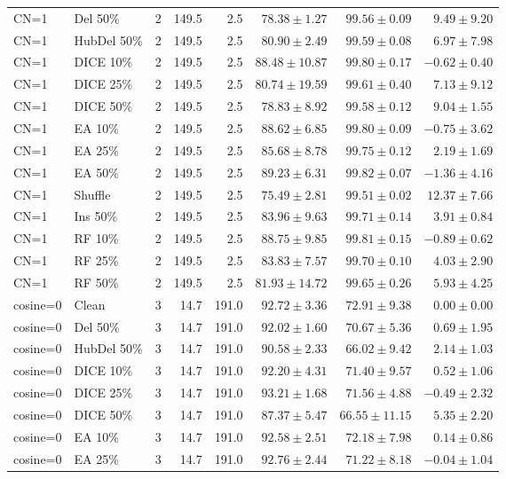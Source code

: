 {\begin{longtable}{llrrrrrr}
CN=1 & Del 50\% & 2 & 149.5 & 2.5 & $78.38\pm1.27$ & $99.56\pm0.09$ & $9.49\pm9.20$ \\
CN=1 & HubDel 50\% & 2 & 149.5 & 2.5 & $80.90\pm2.49$ & $99.59\pm0.08$ & $6.97\pm7.98$ \\
CN=1 & DICE 10\% & 2 & 149.5 & 2.5 & $88.48\pm10.87$ & $99.80\pm0.17$ & $-0.62\pm0.40$ \\
CN=1 & DICE 25\% & 2 & 149.5 & 2.5 & $80.74\pm19.59$ & $99.61\pm0.40$ & $7.13\pm9.12$ \\
CN=1 & DICE 50\% & 2 & 149.5 & 2.5 & $78.83\pm8.92$ & $99.58\pm0.12$ & $9.04\pm1.55$ \\
CN=1 & EA 10\% & 2 & 149.5 & 2.5 & $88.62\pm6.85$ & $99.80\pm0.09$ & $-0.75\pm3.62$ \\
CN=1 & EA 25\% & 2 & 149.5 & 2.5 & $85.68\pm8.78$ & $99.75\pm0.12$ & $2.19\pm1.69$ \\
CN=1 & EA 50\% & 2 & 149.5 & 2.5 & $89.23\pm6.31$ & $99.82\pm0.07$ & $-1.36\pm4.16$ \\
CN=1 & Shuffle & 2 & 149.5 & 2.5 & $75.49\pm2.81$ & $99.51\pm0.02$ & $12.37\pm7.66$ \\
CN=1 & Ins 50\% & 2 & 149.5 & 2.5 & $83.96\pm9.63$ & $99.71\pm0.14$ & $3.91\pm0.84$ \\
CN=1 & RF 10\% & 2 & 149.5 & 2.5 & $88.75\pm9.85$ & $99.81\pm0.15$ & $-0.89\pm0.62$ \\
CN=1 & RF 25\% & 2 & 149.5 & 2.5 & $83.83\pm7.57$ & $99.70\pm0.10$ & $4.03\pm2.90$ \\
CN=1 & RF 50\% & 2 & 149.5 & 2.5 & $81.93\pm14.72$ & $99.65\pm0.26$ & $5.93\pm4.25$ \\
cosine=0 & Clean & 3 & 14.7 & 191.0 & $92.72\pm3.36$ & $72.91\pm9.38$ & $0.00\pm0.00$ \\
cosine=0 & Del 50\% & 3 & 14.7 & 191.0 & $92.02\pm1.60$ & $70.67\pm5.36$ & $0.69\pm1.95$ \\
cosine=0 & HubDel 50\% & 3 & 14.7 & 191.0 & $90.58\pm2.33$ & $66.02\pm9.42$ & $2.14\pm1.03$ \\
cosine=0 & DICE 10\% & 3 & 14.7 & 191.0 & $92.20\pm4.31$ & $71.40\pm9.57$ & $0.52\pm1.06$ \\
cosine=0 & DICE 25\% & 3 & 14.7 & 191.0 & $93.21\pm1.68$ & $71.56\pm4.88$ & $-0.49\pm2.32$ \\
cosine=0 & DICE 50\% & 3 & 14.7 & 191.0 & $87.37\pm5.47$ & $66.55\pm11.15$ & $5.35\pm2.20$ \\
cosine=0 & EA 10\% & 3 & 14.7 & 191.0 & $92.58\pm2.51$ & $72.18\pm7.98$ & $0.14\pm0.86$ \\
cosine=0 & EA 25\% & 3 & 14.7 & 191.0 & $92.76\pm2.44$ & $71.22\pm8.18$ & $-0.04\pm1.04$ \\

\end{longtable}}

